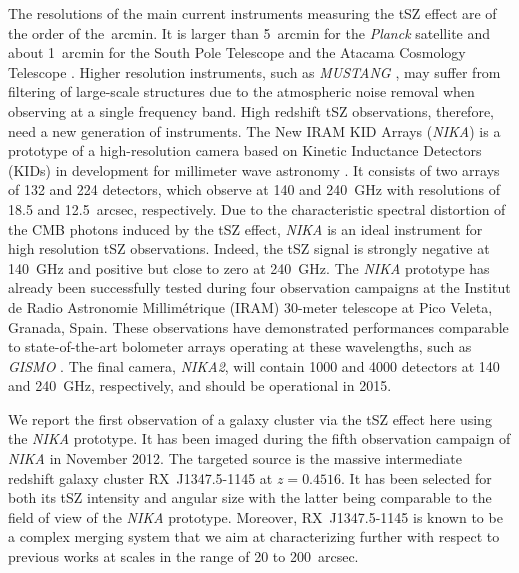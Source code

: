 The resolutions of the main current instruments measuring the tSZ effect are of the order of the~arcmin. It is larger than 5~arcmin for the {\it Planck} satellite \citep{PLANCK_mission} and about 1~arcmin for the South Pole Telescope \citep[{\it SPT};][]{SPT} and the Atacama Cosmology Telescope \citep[{\it ACT};][]{ACT}. Higher resolution instruments, such as {\it MUSTANG} \citep[$\sim 8$~arcsec resolution at 90~GHz;][]{mason_2010, korngut_2011}, may suffer from filtering of large-scale structures due to the atmospheric noise removal when observing at a single frequency band. High redshift tSZ observations, therefore, need a new generation of instruments. The New IRAM KID Arrays ({\it NIKA}) is a prototype of a high-resolution camera based on Kinetic Inductance Detectors (KIDs) \citep{day_2003,KID_for_CMB} in development for millimeter wave astronomy \citep{NIKA_2011}. It consists of two arrays of 132 and 224 detectors, which observe at 140 and 240~GHz with resolutions of 18.5 and 12.5~arcsec, respectively. Due to the characteristic spectral distortion of the CMB photons induced by the tSZ effect, {\it NIKA} is an ideal instrument for high resolution tSZ observations. Indeed, the tSZ signal is strongly negative at 140~GHz and positive but close to zero at 240~GHz. The {\it NIKA} prototype has already been successfully tested during four observation campaigns \citep{NIKA_2010,NIKA_2011} at the Institut de Radio Astronomie Millim\'etrique (IRAM) 30-meter telescope at Pico Veleta, Granada, Spain. These observations have demonstrated performances comparable to state-of-the-art bolometer arrays operating at these wavelengths, such as {\it GISMO} \citep{gismo}. The final camera, {\it NIKA2}, will contain 1000 and 4000 detectors at 140 and 240~GHz, respectively, and should be operational in 2015.

We report the first observation of a galaxy cluster via the tSZ effect here using the {\it NIKA} prototype. It has been imaged during the fifth observation campaign of {\it NIKA} in November 2012. The targeted source is the massive intermediate redshift galaxy cluster \mbox{RX~J1347.5-1145} at $z = 0.4516$. It has been selected for both its tSZ intensity and angular size with the latter being comparable to the field of view of the {\it NIKA }prototype. Moreover, \mbox{RX~J1347.5-1145} is known to be a complex merging system that we aim at characterizing further with respect to previous works at scales in the range of 20 to 200~arcsec.
   
